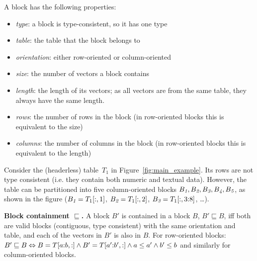 A block has the following properties:
\begin{itemize}
\item \textit{type}: a block is type-consistent, so it has one type
\item \textit{table}: the table that the block belongs to
\item \textit{orientation}: either row-oriented or column-oriented
\item \textit{size}: the number of vectors a block contains
\item \textit{length}: the length of its vectors; as all vectors are from the same table, they always have the same length.
\item \textit{rows}: the number of rows in the block
(in row-oriented blocks this is equivalent to the size)
\item \textit{columns}: the number of columns in the block (in row-oriented blocks this is equivalent to the length)
\end{itemize}



\begin{example}
Consider the (headerless) table~$T_1$ in Figure~\ref{fig:main_example}.
Its rows are not type consistent (i.e. they contain both numeric and textual data).
However, the table can be partitioned into five column-oriented blocks $B_{\textit{1}}, B_{\textit{2}}, B_{\textit{3}}, B_{\textit{4}}, B_{\textit{5}}$, as shown in the figure ($B_{\textit{1}} = T_1[:,1]$, $B_{\textit{2}} = T_1[:,2]$, $B_{\textit{3}} = T_1[:,3{:}8]$, \dots).
\end{example}

\begin{definition}
\textbf{Block containment $\sqsubseteq$.} 
A block $B'$ is contained in a block $B$, $B' \sqsubseteq B$, iff both are valid blocks (contiguous, type consistent) with the same orientation and table, and each of the vectors in $B'$ is also in $B$. For row-oriented blocks: $B' \sqsubseteq B \Leftrightarrow B=T[a{:}b,:] \wedge B'=T[a'{:}b',:] \wedge a \leq a' \wedge b' \leq b$ and similarly for column-oriented blocks.
\end{definition}


